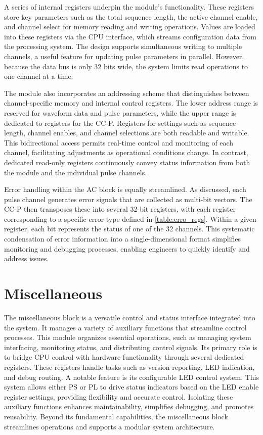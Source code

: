 A series of internal registers underpin the module's functionality. These registers store key parameters such as the total sequence length, the active channel enable, and channel select for memory reading and writing operations. Values are loaded into these registers via the CPU interface, which streams configuration data from the processing system. The design supports simultaneous writing to multiple channels, a useful feature for updating pulse parameters in parallel. However, because the data bus is only 32 bits wide, the system limits read operations to one channel at a time.

The module also incorporates an addressing scheme that distinguishes between channel-specific memory and internal control registers. The lower address range is reserved for waveform data and pulse parameters, while the upper range is dedicated to registers for the CC-P. Registers for settings such as sequence length, channel enables, and channel selections are both readable and writable. This bidirectional access permits real-time control and monitoring of each channel, facilitating adjustments as operational conditions change. In contrast, dedicated read-only registers continuously convey status information from both the module and the individual pulse channels.

Error handling within the AC block is equally streamlined. As discussed, each pulse channel generates error signals that are collected as multi-bit vectors. The CC-P then transposes these into several 32-bit registers, with each register corresponding to a specific error type defined in \autoref{table:erro_regs}. Within a given register, each bit represents the status of one of the 32 channels. This systematic condensation of error information into a single-dimensional format simplifies monitoring and debugging processes, enabling engineers to quickly identify and address issues.

\section{Miscellaneous}

The miscellaneous block is a versatile control and status interface integrated into the system. It manages a variety of auxiliary functions that streamline control processes. This module organizes essential operations, such as managing system interfacing, monitoring status, and distributing control signals. Its primary role is to bridge CPU control with hardware functionality through several dedicated registers. These registers handle tasks such as version reporting, LED indication, and debug routing. A notable feature is its configurable LED control system. This system allows either PS or PL to drive status indicators based on the LED enable register settings, providing flexibility and accurate control. Isolating these auxiliary functions enhances maintainability, simplifies debugging, and promotes reusability. Beyond its fundamental capabilities, the miscellaneous block streamlines operations and supports a modular system architecture.

